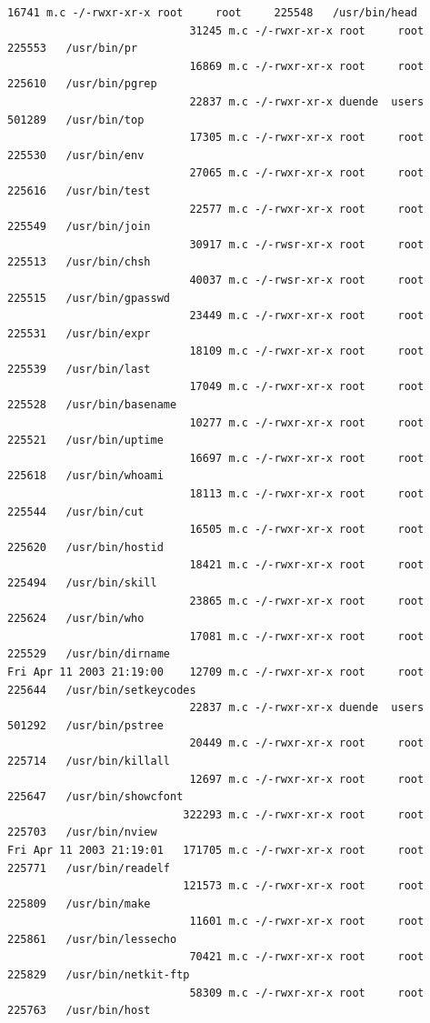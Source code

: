 {\begin{lstlisting}[style=terminal]
                            16741 m.c -/-rwxr-xr-x root     root     225548   /usr/bin/head
                            31245 m.c -/-rwxr-xr-x root     root     225553   /usr/bin/pr
                            16869 m.c -/-rwxr-xr-x root     root     225610   /usr/bin/pgrep
                            22837 m.c -/-rwxr-xr-x duende  users    501289   /usr/bin/top
                            17305 m.c -/-rwxr-xr-x root     root     225530   /usr/bin/env
                            27065 m.c -/-rwxr-xr-x root     root     225616   /usr/bin/test
                            22577 m.c -/-rwxr-xr-x root     root     225549   /usr/bin/join
                            30917 m.c -/-rwsr-xr-x root     root     225513   /usr/bin/chsh
                            40037 m.c -/-rwsr-xr-x root     root     225515   /usr/bin/gpasswd
                            23449 m.c -/-rwxr-xr-x root     root     225531   /usr/bin/expr
                            18109 m.c -/-rwxr-xr-x root     root     225539   /usr/bin/last
                            17049 m.c -/-rwxr-xr-x root     root     225528   /usr/bin/basename
                            10277 m.c -/-rwxr-xr-x root     root     225521   /usr/bin/uptime
                            16697 m.c -/-rwxr-xr-x root     root     225618   /usr/bin/whoami
                            18113 m.c -/-rwxr-xr-x root     root     225544   /usr/bin/cut
                            16505 m.c -/-rwxr-xr-x root     root     225620   /usr/bin/hostid
                            18421 m.c -/-rwxr-xr-x root     root     225494   /usr/bin/skill
                            23865 m.c -/-rwxr-xr-x root     root     225624   /usr/bin/who
                            17081 m.c -/-rwxr-xr-x root     root     225529   /usr/bin/dirname
Fri Apr 11 2003 21:19:00    12709 m.c -/-rwxr-xr-x root     root     225644   /usr/bin/setkeycodes
                            22837 m.c -/-rwxr-xr-x duende  users    501292   /usr/bin/pstree
                            20449 m.c -/-rwxr-xr-x root     root     225714   /usr/bin/killall
                            12697 m.c -/-rwxr-xr-x root     root     225647   /usr/bin/showcfont
                           322293 m.c -/-rwxr-xr-x root     root     225703   /usr/bin/nview
Fri Apr 11 2003 21:19:01   171705 m.c -/-rwxr-xr-x root     root     225771   /usr/bin/readelf
                           121573 m.c -/-rwxr-xr-x root     root     225809   /usr/bin/make
                            11601 m.c -/-rwxr-xr-x root     root     225861   /usr/bin/lessecho
                            70421 m.c -/-rwxr-xr-x root     root     225829   /usr/bin/netkit-ftp
                            58309 m.c -/-rwxr-xr-x root     root     225763   /usr/bin/host
\end{lstlisting}
}

